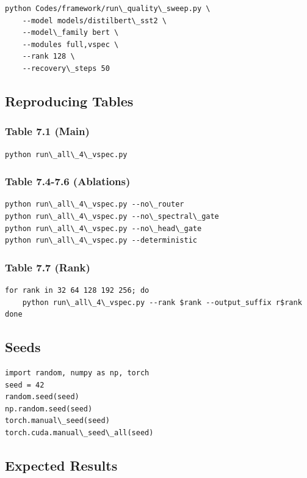 \begin{lstlisting}
python Codes/framework/run\_quality\_sweep.py \
    --model models/distilbert\_sst2 \
    --model\_family bert \
    --modules full,vspec \
    --rank 128 \
    --recovery\_steps 50
\end{lstlisting}

\subsection{Reproducing Tables}

\subsubsection{Table 7.1 (Main)}
\begin{lstlisting}
python run\_all\_4\_vspec.py
\end{lstlisting}

\subsubsection{Table 7.4-7.6 (Ablations)}
\begin{lstlisting}
python run\_all\_4\_vspec.py --no\_router
python run\_all\_4\_vspec.py --no\_spectral\_gate
python run\_all\_4\_vspec.py --no\_head\_gate
python run\_all\_4\_vspec.py --deterministic
\end{lstlisting}

\subsubsection{Table 7.7 (Rank)}
\begin{lstlisting}
for rank in 32 64 128 192 256; do
    python run\_all\_4\_vspec.py --rank $rank --output_suffix r$rank
done
\end{lstlisting}

\subsection{Seeds}

\begin{lstlisting}
import random, numpy as np, torch
seed = 42
random.seed(seed)
np.random.seed(seed)
torch.manual\_seed(seed)
torch.cuda.manual\_seed\_all(seed)
\end{lstlisting}

\subsection{Expected Results}

